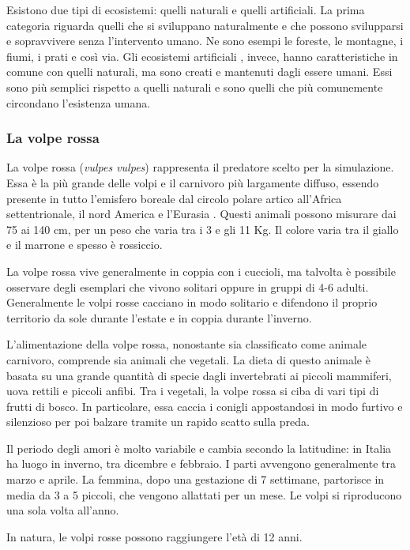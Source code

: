 \documentclass[11pt]{article}
\begin{document}
Esistono due tipi di ecosistemi: quelli naturali e quelli artificiali. La prima categoria riguarda quelli che si sviluppano naturalmente e che possono svilupparsi e sopravvivere senza l'intervento umano. Ne sono esempi le foreste, le montagne, i fiumi, i prati e così via. Gli ecosistemi artificiali \cite{ArtificialEcosystems}, invece, hanno caratteristiche in comune con quelli naturali, ma sono creati e mantenuti dagli essere umani. Essi sono più semplici rispetto a quelli naturali e sono quelli che più comunemente circondano l'esistenza umana. 

\subsubsection{La volpe rossa}
\label{volpe}
La volpe rossa (\emph{vulpes vulpes}) rappresenta il predatore scelto per la simulazione. Essa è la più grande delle volpi e il carnivoro più largamente diffuso, essendo presente in tutto l'emisfero boreale dal circolo polare artico all'Africa settentrionale, il nord America e l'Eurasia \cite{WikiVolpe}.
Questi animali possono misurare dai 75 ai 140 cm, per un peso che varia tra i 3 e gli 11 Kg. Il colore varia tra il giallo e il marrone e spesso è rossiccio. 

La volpe rossa vive generalmente in coppia con i cuccioli, ma talvolta è possibile osservare degli esemplari che vivono solitari oppure in gruppi di 4-6 adulti. Generalmente le volpi rosse cacciano in modo solitario e difendono il proprio territorio da sole durante l'estate e in coppia durante l'inverno. 

L'alimentazione della volpe rossa, nonostante sia classificato come animale carnivoro, comprende sia animali che vegetali. La dieta di questo animale è basata su una grande quantità di specie dagli invertebrati ai piccoli mammiferi, uova rettili e piccoli anfibi. Tra i vegetali, la volpe rossa si ciba di vari tipi di frutti di bosco. In particolare, essa caccia i conigli appostandosi in modo furtivo e silenzioso per poi balzare tramite un rapido scatto sulla preda. 

Il periodo degli amori è molto variabile e cambia secondo la latitudine: in Italia ha luogo in inverno, tra dicembre e febbraio. I parti avvengono generalmente tra marzo e aprile. La femmina, dopo una gestazione di 7 settimane, partorisce in media da 3 a 5 piccoli, che vengono allattati per un mese. Le volpi si riproducono una sola volta all'anno. 

In natura, le volpi rosse possono raggiungere l'età di 12 anni.
\end{document}
